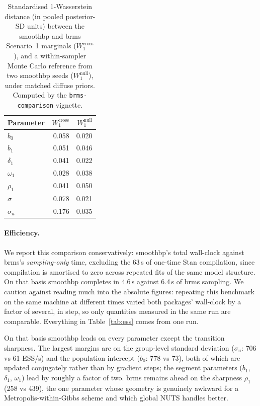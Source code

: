 \documentclass[12pt]{article}
\newcommand{\pkg}[1]{\textsf{#1}}
\newcommand{\code}[1]{\texttt{#1}}
\begin{document}
\begin{table}[t]
\centering
\caption{Standardised 1-Wasserstein distance (in pooled posterior-SD units) between the \pkg{smoothbp} and \pkg{brms} Scenario~1 marginals ($W_1^{\text{cross}}$), and a within-sampler Monte Carlo reference from two \pkg{smoothbp} seeds ($W_1^{\text{null}}$), under matched diffuse priors. Computed by the \code{brms-comparison} vignette.}
\label{tab:w1}
\begin{tabular}{lrr}
\toprule
Parameter & $W_1^{\text{cross}}$ & $W_1^{\text{null}}$ \\
\midrule
$b_0$        & 0.058 & 0.020 \\
$b_1$        & 0.051 & 0.046 \\
$\delta_1$   & 0.041 & 0.022 \\
$\omega_1$   & 0.028 & 0.038 \\
$\rho_1$     & 0.041 & 0.050 \\
$\sigma$     & 0.078 & 0.021 \\
$\sigma_u$   & 0.176 & 0.035 \\
\bottomrule
\end{tabular}
\end{table}

\paragraph{Efficiency.} We report this comparison conservatively: \pkg{smoothbp}'s total wall-clock against \pkg{brms}'s \emph{sampling-only} time, excluding the 63\,s of one-time Stan compilation, since compilation is amortised to zero across repeated fits of the same model structure. On that basis \pkg{smoothbp} completes in 4.6\,s against 6.4\,s of \pkg{brms} sampling. We caution against reading much into the absolute figures: repeating this benchmark on the same machine at different times varied both packages' wall-clock by a factor of several, in step, so only quantities measured in the same run are comparable. Everything in Table~\ref{tab:ess} comes from one run.

On that basis \pkg{smoothbp} leads on every parameter except the transition sharpness. The largest margins are on the group-level standard deviation ($\sigma_u$: 706 vs 61 ESS/s) and the population intercept ($b_0$: 778 vs 73), both of which are updated conjugately rather than by gradient steps; the segment parameters ($b_1$, $\delta_1$, $\omega_1$) lead by roughly a factor of two. \pkg{brms} remains ahead on the sharpness $\rho_1$ (258 vs 439), the one parameter whose geometry is genuinely awkward for a Metropolis-within-Gibbs scheme and which global NUTS handles better.
\end{document}
